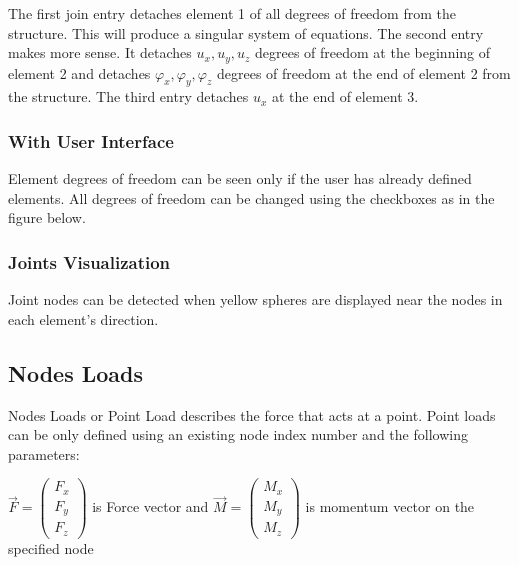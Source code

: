 \documentclass[letterpaper,10pt,english]{sphinxmanual}
\begin{document}
\begin{sphinxVerbatim}[commandchars=\\\{\}]
\end{sphinxVerbatim}

The first join entry detaches element 1 of all degrees of freedom from the structure.
This will produce a singular system of equations.
The second entry makes more sense. It detaches \(u_x, u_y, u_z\) degrees of freedom
at the beginning of element 2 and detaches \(\varphi_x, \varphi_y, \varphi_z\) degrees of freedom at the end of
element 2 from the structure. The third entry detaches \(u_x\) at the end of element 3.


\subsubsection{With User Interface}
\label{\detokenize{making_a_model:id10}}
Element degrees of freedom can be seen only if the user has already defined elements.
All degrees of freedom can be changed using the checkboxes as in the figure below.

\noindent{}


\subsubsection{Joints Visualization}
\label{\detokenize{making_a_model:joints-visualization}}
Joint nodes can be detected when yellow spheres are displayed near the nodes in each element’s direction.

\noindent{}


\subsection{Nodes Loads}
\label{\detokenize{making_a_model:nodes-loads}}
Nodes Loads or Point Load describes the force that acts at a point.
Point loads can be only defined using an existing node index number and the following parameters:

\(\vec{F}= \left( \begin{array}{c} F_x \\ F_y \\ F_z \end{array}\right)\) is Force vector
and
\(\vec{M}= \left( \begin{array}{c} M_x \\ M_y \\ M_z \end{array}\right)\) is momentum vector on the specified node
\end{document}
